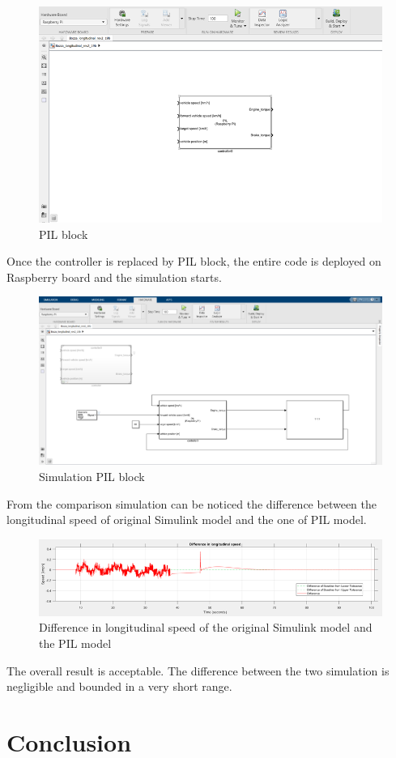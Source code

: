 \documentclass[12pt,a4paper]{report}
\begin{document}
\begin{figure}[htbp]
	\centering
	\includegraphics[scale=0.7]{PIL_block.png}
	\caption{PIL block}
\end{figure} \FloatBarrier
Once the controller is replaced by PIL block, the entire code is deployed on Raspberry board and the simulation starts. 
\begin{figure}[htbp]
	\centering
	\includegraphics[scale=0.7]{PIL_sim.png}
	\caption{Simulation PIL block}
\end{figure} \FloatBarrier
From the comparison simulation can be noticed the difference between the longitudinal speed of original Simulink model and the one of PIL model.
\begin{figure}[htbp]
	\centering
	\includegraphics[scale=1]{plot_PIL.png}
	\caption{Difference in longitudinal speed of the original Simulink model and the PIL model}
\end{figure} \FloatBarrier

The overall result is acceptable.
The difference between the two simulation is negligible and bounded in a very short range.

\chapter{Conclusion}
	
	
\end{document}
